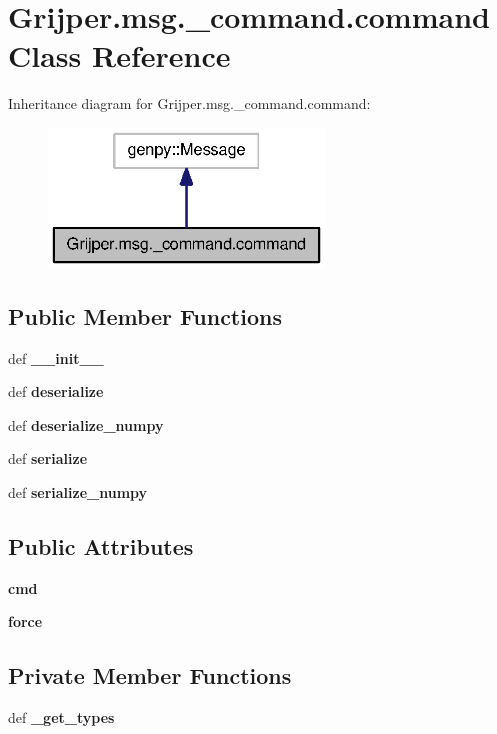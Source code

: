 \section{Grijper.\-msg.\-\_\-command.\-command Class Reference}
\label{classGrijper_1_1msg_1_1__command_1_1command}


Inheritance diagram for Grijper.\-msg.\-\_\-command.\-command\-:\nopagebreak
\begin{figure}[H]
\begin{center}
\leavevmode
\includegraphics[width=208pt]{classGrijper_1_1msg_1_1__command_1_1command__inherit__graph}
\end{center}
\end{figure}
\subsection*{Public Member Functions}
\begin{DoxyCompactItemize}
\item 
def {\bf \-\_\-\-\_\-init\-\_\-\-\_\-}
\item 
def {\bf deserialize}
\item 
def {\bf deserialize\-\_\-numpy}
\item 
def {\bf serialize}
\item 
def {\bf serialize\-\_\-numpy}
\end{DoxyCompactItemize}
\subsection*{Public Attributes}
\begin{DoxyCompactItemize}
\item 
{\bf cmd}
\item 
{\bf force}
\end{DoxyCompactItemize}
\subsection*{Private Member Functions}
\begin{DoxyCompactItemize}
\item 
def {\bf \-\_\-get\-\_\-types}
\end{DoxyCompactItemize}
